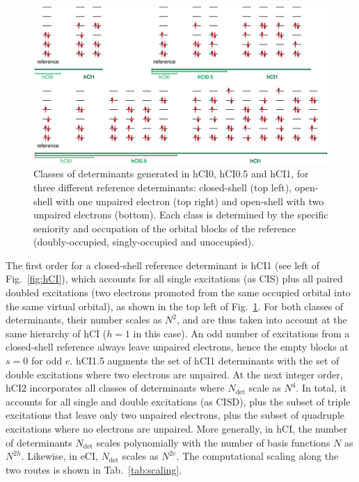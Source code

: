\documentclass[aip,jcp,reprint,noshowkeys,superscriptaddress]{revtex4-1}
\newcommand{\Ndet}{N_\text{det}}
\begin{document}
\begin{figure}%
\includegraphics[width=1.0\linewidth]{determinants}
\caption{Classes of determinants generated in hCI0, hCI0.5 and hCI1, for three different reference determinants:
closed-shell (top left), open-shell with one unpaired electron (top right) and open-shell with two unpaired electrons (bottom).
Each class is determined by the specific seniority and occupation of the orbital blocks of the reference (doubly-occupied, singly-occupied and unoccupied).}
\label{fig:determinants}
\end{figure}

The first order for a closed-shell reference determinant is hCI1 (see left of Fig.~\ref{fig:hCI}), which accounts for all single excitations (as CIS) 
plus all paired doubled excitations (two electrons promoted from the same occupied orbital into the same virtual orbital),
as shown in the top left of Fig.~\ref{fig:determinants}.
For both classes of determinants, their number scales as $N^2$, and are thus taken into account at the same hierarchy of hCI ($h=1$ in this case).
An odd number of excitations from a closed-shell reference always leave unpaired electrons, hence the empty blocks at $s=0$ for odd $e$.
hCI1.5 augments the set of hCI1 determinants with the set of double excitations where two electrons are unpaired.
At the next integer order, hCI2 incorporates all classes of determinants where $\Ndet$ scale as $N^4$.
In total, it accounts for all single and double excitations (as CISD), plus the subset of triple excitations that leave only two unpaired electrons, 
plus the subset of quadruple excitations where no electrons are unpaired.
More generally, in hCI, the number of determinants $\Ndet$ scales polynomially with the number of basis functions $N$ as $N^{2h}$.
Likewise, in eCI, $\Ndet$ scales as $N^{2e}$.
The computational scaling along the two routes is shown in Tab.~\ref{tab:scaling}.
 
\end{document}
